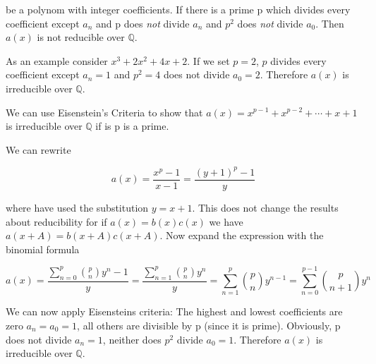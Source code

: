 be a polynom with integer coefficients. If there is a prime p which
divides every coefficient except \(a_n\) and p does \emph{not} divide
\(a_n\) and \(p^2\) does \emph{not} divide \(a_0\). Then \(a(x)\) is not
reducible over \(\mathbb{Q}\).

As an example consider \(x^3 + 2x^2 + 4x + 2\). If we set \(p=2\), \(p\)
divides every coefficient except \(a_n=1\) and \(p^2=4\) does not divide
\(a_0=2\). Therefore \(a(x)\) is irreducible over \(\mathbb{Q}\).

We can use Eisenstein's Criteria to show that
\(a(x) = x^{p-1} + x^{p-2} + \cdots + x + 1\) is irreducible over
\(\mathbb{Q}\) if is p is a prime.

We can rewrite

\[
a(x) = \frac{x^p-1}{x-1} = \frac{(y+1)^p-1}{y}
\]

where have used the substitution \(y=x+1\). This does not change the
results about reducibility for if \(a(x) = b(x)c(x)\) we have
\(a(x+A) = b(x+A)c(x+A)\). Now expand the expression with the binomial
formula

\[
a(x) = \frac{\sum_{n=0}^p {p \choose n} y^n - 1}{y} = \frac{\sum_{n=1}^p {p \choose n} y^n}{y} = \sum_{n=1}^p {p \choose n} y^{n-1} = \sum_{n=0}^{p-1} {p \choose n+1} y^n
\]

We can now apply Eisensteins criteria: The highest and lowest
coefficients are zero \(a_n = a_0=1\), all others are divisible by p
(since it is prime). Obviously, p does not divide \(a_n=1\), neither
does \(p^2\) divide \(a_0=1\). Therefore \(a(x)\) is irreducible over
\(\mathbb{Q}\).
